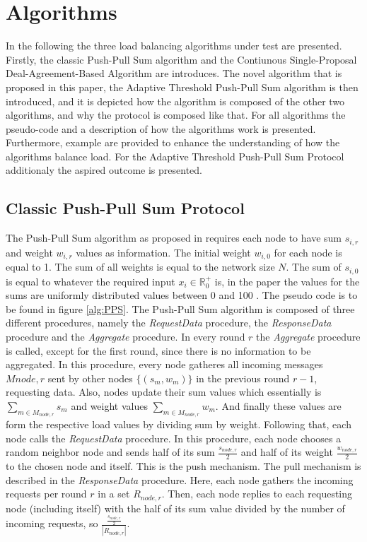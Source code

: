 \chapter{Algorithms}\label{chap:algorithms}
In the following the three load balancing algorithms under test are presented. Firstly, the classic Push-Pull Sum algorithm and the Contiunous Single-Proposal Deal-Agreement-Based Algorithm are introduces. The novel algorithm that is proposed in this paper, the Adaptive Threshold Push-Pull Sum algorithm is then introduced, and it is depicted how the algorithm is composed of the other two algorithms, and why the protocol is composed like that. For all algorithms the pseudo-code and a description of how the algorithms work is presented. Furthermore, example are provided to enhance the understanding of how the algorithms balance load. For the Adaptive Threshold Push-Pull Sum Protocol additionaly the aspired outcome is presented.

\section{Classic Push-Pull Sum Protocol}\label{sec:classicPPS}
The Push-Pull Sum algorithm as proposed in \cite{nugroho2023PushPullSumDataAg} requires each node to have sum $s_{i,r}$ and weight $w_{i,r}$ values as information. The initial weight $w_{i,0}$ for each node is equal to 1. The sum of all weights is equal to the network size $N$. The sum of $s_{i,0}$ is equal to whatever the required input $x_i \in \mathbb{R}^{+}_{0}$ is, in the paper the values for the sums are uniformly distributed values between 0 and 100 \cite{nugroho2023PushPullSumDataAg}. The pseudo code is to be found in figure \ref{alg:PPS}. The Push-Pull Sum algorithm is composed of three different procedures, namely the \textit{RequestData} procedure, the \textit{ResponseData} procedure and the \textit{Aggregate} procedure. In every round $r$ the \textit{Aggregate} procedure is called, except for the first round, since there is no information to be aggregated. In this procedure, every node gatheres all incoming messages $M{node,r}$ sent by other nodes $\{(s_m, w_m)\}$ in the previous round $r-1$, requesting data. Also, nodes update their sum values which essentially is $\sum_{m \in M_{node,r}}{s_m}$ and weight values $\sum_{m \in M_{node,r}}{w_m}$. And finally these values are form the respective load values by dividing sum by weight. Following that, each node calls the \textit{RequestData} procedure. In this procedure, each node chooses a random neighbor node and sends half of its sum $\frac{s_{node,r}}{2}$ and half of its weight $\frac{w_{node,r}}{2}$ to the chosen node and itself. This is the push mechanism. The pull mechanism is described in the \textit{ResponseData} procedure. Here, each node gathers the incoming requests per round $r$ in a set $R_{node, r}$. Then, each node replies to each requesting node (including itself) with the half of its sum value divided by the number of incoming requests, so $\frac{\frac{s_{node,r}}{2}}{|R_{node, r}|}$.

